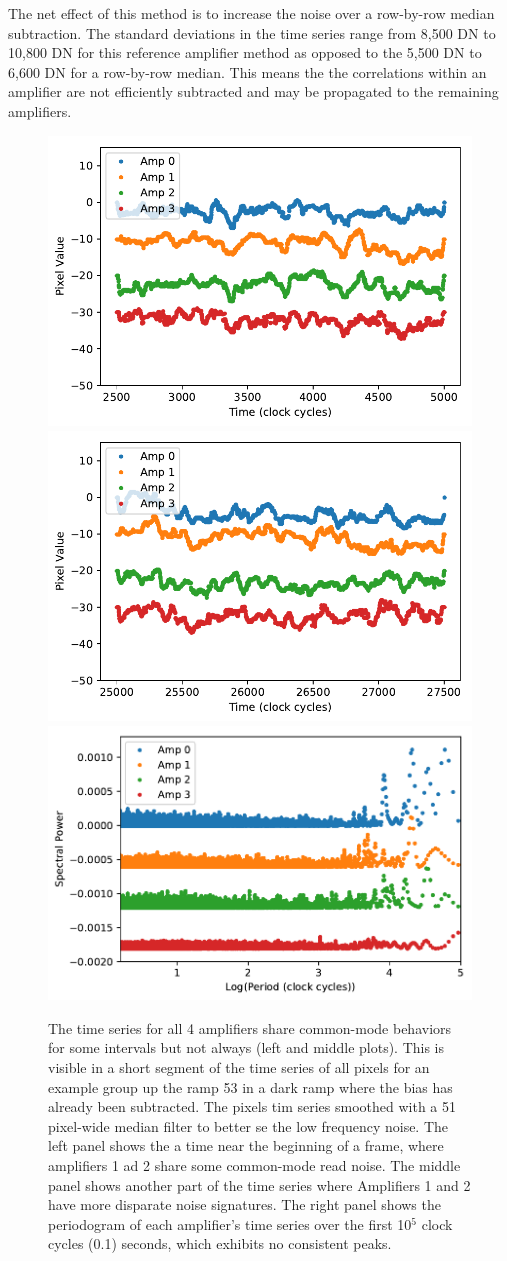 \documentclass{aastex62}
\begin{document}
The net effect of this method is to increase the noise over a row-by-row median subtraction.
The standard deviations in the time series range from 8,500 DN to 10,800 DN for this reference amplifier method as opposed to the 5,500 DN to 6,600 DN for a row-by-row median.
This means the the correlations within an amplifier are not efficiently subtracted and may be propagated to the remaining amplifiers.

\begin{figure}[!hbtp]
\centering
\includegraphics[width=.32\columnwidth]{pixeltime_series_0.pdf}
\includegraphics[width=.32\columnwidth]{pixeltime_series_1.pdf}
\includegraphics[width=.32\columnwidth]{all_amp_periodograms.pdf}
\caption{The time series for all 4 amplifiers share common-mode behaviors for some intervals but not always (left and middle plots).
This is visible in a short segment of the time series of all pixels for an example group up the ramp 53 in a dark ramp where the bias has already been subtracted.
The pixels tim series smoothed with a 51 pixel-wide median filter to better se the low frequency noise.
The left panel shows the a time near the beginning of a frame, where amplifiers 1 ad 2 share some common-mode read noise.
The middle panel shows another part of the time series where Amplifiers 1 and 2 have more disparate noise signatures.
The right panel shows the periodogram of each amplifier's time series over the first 10$^5$ clock cycles (0.1) seconds, which exhibits no consistent peaks.
}\label{fig:darkPixelTimeSeries}
\end{figure}
\end{document}
